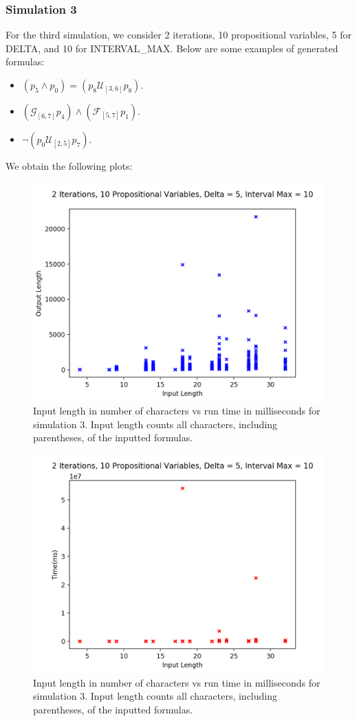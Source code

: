 \documentclass[runningheads]{llncs}
\begin{document}
\subsubsection{Simulation 3}
For the third simulation, we consider 2 iterations, 10 propositional variables, 5 for DELTA, and 10 for INTERVAL\_MAX. Below are some examples of generated formulas:
\begin{itemize}
    \item $(p_5 \land p_0) = (p_8 \mathcal{U}_{[3,6]} p_8)$.
    \item $(\mathcal{G}_{[6,7]} p_4) \land (\mathcal{F}_{[5,7]} p_1)$.
    \item $\neg (p_0 \mathcal{U}_{[2,5]} p_7)$.
\end{itemize}
We obtain the following plots:
\begin{figure}[H]
    \centering
    \includegraphics[scale=0.75]{images/Sim3Length.png}
    \caption{Input length in number of characters vs run time in milliseconds for simulation 3. Input length counts all characters, including parentheses, of the inputted formulas.}
\end{figure}
\begin{figure}[H]
    \centering
    \includegraphics[scale=0.75]{images/Sim3Time.png}
    \caption{Input length in number of characters vs run time in milliseconds for simulation 3. Input length counts all characters, including parentheses, of the inputted formulas.}
\end{figure}
\end{document}
